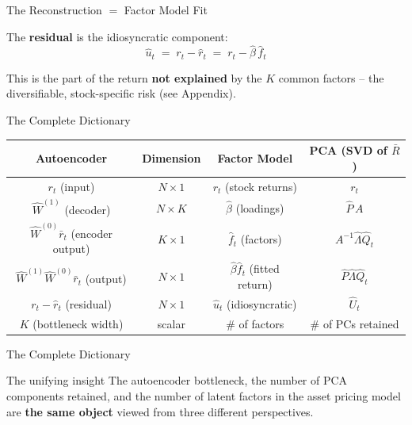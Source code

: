 \documentclass[aspectratio=169]{beamer}
\begin{document}
%
%
\begin{frame}{The Reconstruction \texorpdfstring{$=$}{=} Factor Model Fit}

The \textbf{residual} is the idiosyncratic component:
\[
\hat{u}_t \;=\; r_t - \hat{r}_t \;=\; r_t - \hat{\beta}\,\hat{f}_t
\]

This is the part of the return \textbf{not explained} by the $K$ common factors -- the diversifiable, stock-specific risk (see Appendix).

\end{frame}
%
%
\begin{frame}{The Complete Dictionary}

\begin{center}
\renewcommand{\arraystretch}{1.6}
\begin{tabular}{c c c c}
\hline
\textbf{Autoencoder} & \textbf{Dimension} & \textbf{Factor Model} & \textbf{PCA (SVD of $\bar{R}$)} \\
\hline
$r_t$ (input) & $N \times 1$ & $r_t$ (stock returns) & $r_t$ \\[3pt]
$\hat{W}^{(1)}$ (decoder) & $N \times K$ & $\hat{\beta}$ (loadings) & $\hat{P}\,A$ \\[3pt]
$\hat{W}^{(0)} \bar{r}_t$ (encoder output) & $K \times 1$ & $\hat{f}_t$ (factors) & $A^{-1}\hat{\Lambda}\hat{Q}_t$ \\[3pt]
$\hat{W}^{(1)}\hat{W}^{(0)}\bar{r}_t$ (output) & $N \times 1$ & $\hat{\beta}\hat{f}_t$ (fitted return) & $\hat{P}\hat{\Lambda}\hat{Q}_t$ \\[3pt]
$r_t - \hat{r}_t$ (residual) & $N \times 1$ & $\hat{u}_t$ (idiosyncratic) & $\hat{U}_t$ \\[3pt]
$K$ (bottleneck width) & scalar & \# of factors & \# of PCs retained \\
\hline
\end{tabular}
\end{center}
\end{frame}
%
%
\begin{frame}{The Complete Dictionary}

\begin{block}{The unifying insight}
The autoencoder bottleneck, the number of PCA components retained, and the number of latent factors in the asset pricing model are \textbf{the same object} viewed from three different perspectives.
\end{block}

\end{frame}
\end{document}
